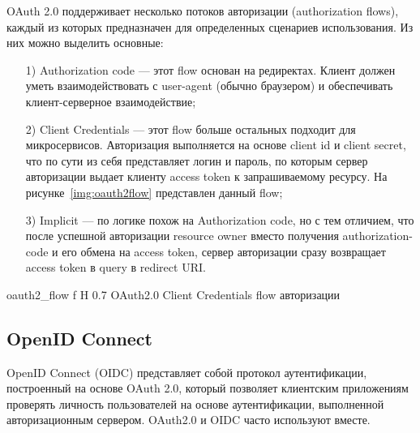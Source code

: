 OAuth 2.0 поддерживает несколько потоков авторизации (authorization flows), каждый из которых предназначен для определенных сценариев использования.
Из них можно выделить основные:
 \begin{enumerate}
  \item[1)] Authorization code --- этот flow основан на редиректах. Клиент должен уметь взаимодействовать с user-agent (обычно браузером) и обеспечивать клиент-серверное взаимодействие;
  \item[2)] Client Credentials --- этот flow больше остальных подходит для микросервисов. Авторизация выполняется на основе client id и client secret, что по сути из себя представляет логин и пароль, по которым сервер авторизации выдает клиенту access token к запрашиваемому ресурсу. На рисунке~\ref{img:oauth2flow} представлен данный flow;
  \item[3)] Implicit --- по логике похож на Authorization code, но с тем отличием, что после успешной авторизации resource owner вместо получения authorization-code и его обмена на access token, сервер авторизации сразу возвращает access token в query в redirect URI.~\cite{oauth2_spec}
\end{enumerate}

    {oauth2_flow}
    {f}
    {H}
    {0.7\textwidth}
    {OAuth2.0 Client Credentials flow авторизации}




\subsection{OpenID Connect}
OpenID Connect (OIDC) представляет собой протокол аутентификации, построенный на основе OAuth 2.0, который позволяет клиентским приложениям проверять личность пользователей на основе аутентификации, выполненной авторизационным сервером. OAuth2.0 и OIDC часто используют вместе.~\cite{oidc}


